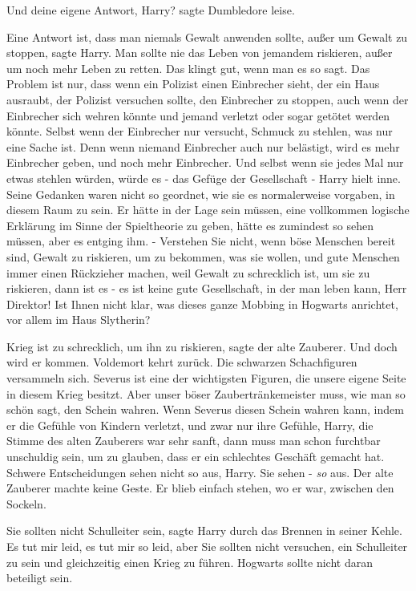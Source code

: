 \glqq Und deine eigene Antwort, Harry?\grqq{} sagte Dumbledore leise.

\glqq Eine Antwort ist, dass man niemals Gewalt anwenden sollte, außer um Gewalt
zu stoppen\grqq{}, sagte Harry. \glqq Man sollte nie das Leben von jemandem
riskieren, außer um noch mehr Leben zu retten. Das klingt gut, wenn man es so
sagt. Das Problem ist nur, dass wenn ein Polizist einen Einbrecher sieht, der
ein Haus ausraubt, der Polizist versuchen sollte, den Einbrecher zu stoppen,
auch wenn der Einbrecher sich wehren könnte und jemand verletzt oder sogar
getötet werden könnte. Selbst wenn der Einbrecher nur versucht, Schmuck zu
stehlen, was nur eine Sache ist. Denn wenn niemand Einbrecher auch nur
belästigt, wird es mehr Einbrecher geben, und noch mehr Einbrecher. Und selbst
wenn sie jedes Mal nur etwas stehlen würden, würde es - das Gefüge der
Gesellschaft -\grqq{} Harry hielt inne. Seine Gedanken waren nicht so geordnet,
wie sie es normalerweise vorgaben, in diesem Raum zu sein. Er hätte in der Lage
sein müssen, eine vollkommen logische Erklärung im Sinne der Spieltheorie zu
geben, hätte es zumindest so sehen müssen, aber es entging ihm. - \glqq
Verstehen Sie nicht, wenn böse Menschen bereit sind, Gewalt zu riskieren, um zu
bekommen, was sie wollen, und gute Menschen immer einen Rückzieher machen, weil
Gewalt zu schrecklich ist, um sie zu riskieren, dann ist es - es ist keine gute
Gesellschaft, in der man leben kann, Herr Direktor! Ist Ihnen nicht klar, was
dieses ganze Mobbing in Hogwarts anrichtet, vor allem im Haus Slytherin?\grqq{}

\glqq Krieg ist zu schrecklich, um ihn zu riskieren\grqq{}, sagte der alte
Zauberer. \glqq Und doch wird er kommen. Voldemort kehrt zurück. Die schwarzen
Schachfiguren versammeln sich. Severus ist eine der wichtigsten Figuren, die
unsere eigene Seite in diesem Krieg besitzt. Aber unser böser
Zaubertränkemeister muss, wie man so schön sagt, den Schein wahren. Wenn Severus
diesen Schein wahren kann, indem er die Gefühle von Kindern verletzt, und zwar
nur ihre Gefühle, Harry\grqq{}, die Stimme des alten Zauberers war sehr sanft,
\glqq dann muss man schon furchtbar unschuldig sein, um zu glauben, dass er ein
schlechtes Geschäft gemacht hat. Schwere Entscheidungen sehen nicht so aus,
Harry. Sie sehen - \emph{so} aus.\grqq{} Der alte Zauberer machte keine Geste.
Er blieb einfach stehen, wo er war, zwischen den Sockeln.

\glqq Sie sollten nicht Schulleiter sein\grqq{}, sagte Harry durch das Brennen
in seiner Kehle. \glqq Es tut mir leid, es tut mir so leid, aber Sie sollten
nicht versuchen, ein Schulleiter zu sein und gleichzeitig einen Krieg zu führen.
Hogwarts sollte nicht daran beteiligt sein.\grqq{}


